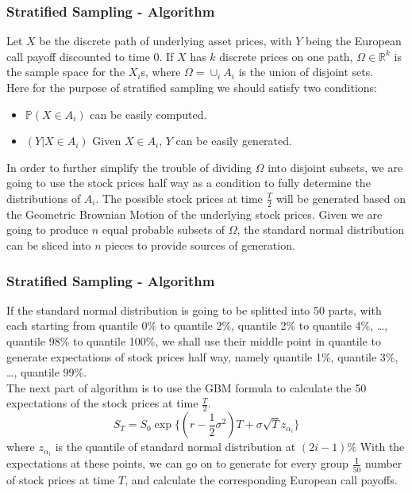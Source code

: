 \documentclass{beamer}
\begin{document}
\begin{frame}
\frametitle{Stratified Sampling - Algorithm}
Let $X$ be the discrete path of underlying asset prices, with $Y$ being the European call payoff discounted to time 0. If $X$ has $k$ discrete prices on one path, $\Omega \in \mathbb{R}^{k}$ is the sample space for the $X_{i}$s, where $\Omega = \cup_{i} A_{i}$ is the union of disjoint sets.\\
Here for the purpose of stratified sampling we should satisfy two conditions:
\begin{itemize}
	\item $\mathbb{P}(X \in A_{i})$ can be easily computed.
	\item $(Y | X \in A_{i})$ Given $X \in A_{i}$, $Y$ can be easily generated.
\end{itemize}
In order to further simplify the trouble of dividing $\Omega$ into disjoint subsets, we are going to use the stock prices half way as a condition to fully determine the distributions of $A_{i}$. The possible stock prices at time $\frac{T}{2}$ will be generated based on the Geometric Brownian Motion of the underlying stock prices. Given we are going to produce $n$ equal probable subsets of $\Omega$, the standard normal distribution can be sliced into $n$ pieces to provide sources of generation.
\end{frame}

\begin{frame}
\frametitle{Stratified Sampling - Algorithm}
If the standard normal distribution is going to be splitted into 50 parts, with each starting from quantile 0\% to quantile 2\%, quantile 2\% to quantile 4\%, \dots, quantile 98\% to quantile 100\%, we shall use their middle point in quantile to generate expectations of stock prices half way, namely quantile 1\%, quantile 3\%, \dots, quantile 99\%.\\
The next part of algorithm is to use the GBM formula to calculate the 50 expectations of the stock prices at time $\frac{T}{2}$.
$$S_{T} = S_{0}\exp\{(r-\frac{1}{2}\sigma^{2})T + \sigma\sqrt{T}z_{\alpha_{i}}\}$$
where $z_{\alpha_{i}}$ is the quantile of standard normal distribution at $(2i-1)\%$
With the expectations at these points, we can go on to generate for every group $\frac{\mathrm{I}}{50}$ number of stock prices at time $T$, and calculate the corresponding European call payoffs.
\end{frame}
\end{document}
